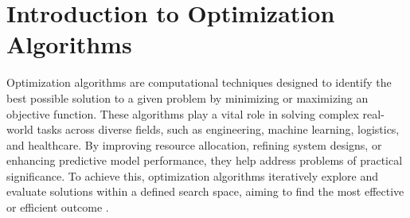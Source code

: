 


\section{Introduction to Optimization Algorithms }

Optimization algorithms are computational techniques designed to identify the best possible solution to a given problem by minimizing or maximizing an objective function. These algorithms play a vital role in solving complex real-world tasks across diverse fields, such as engineering, machine learning, logistics, and healthcare. By improving resource allocation, refining system designs, or enhancing predictive model performance, they help address problems of practical significance. To achieve this, optimization algorithms iteratively explore and evaluate solutions within a defined search space, aiming to find the most effective or efficient outcome  \parencite{weise2009global}.

